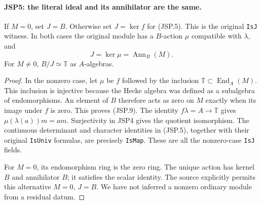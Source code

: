 \paragraph{JSP5: the literal ideal and its annihilator are the same.}
\label{claim:JSP5}
If $M=0$, set $J=B$. Otherwise set $J=\ker f$ for (JSP.5).
This is the original \texttt{IsJ} witness. In both cases the
original module has a $B$-action $\mu$ compatible with $\lambda$,
and
\[
               J=\ker\mu=\operatorname{Ann}_B(M).
 \tag{JSP.9}
\]
For $M\ne0$, $B/J\simeq\mathbb T$ as $A$-algebras.
\begin{proof}
In the nonzero case, let $\mu$ be $f$ followed by the inclusion
$\mathbb T\subset\operatorname{End}_A(M)$. This inclusion is
injective because the Hecke algebra was defined as a subalgebra
of endomorphisms. An element of $B$ therefore acts as zero on
$M$ exactly when its image under $f$ is zero. This proves
(JSP.9). The identity $f\lambda=A\to\mathbb T$ gives
$\mu(\lambda(a))m=am$. Surjectivity in JSP4 gives the
quotient isomorphism. The continuous determinant and character
identities in (JSP.5), together with their original
\texttt{IsUniv} formulas, are precisely \texttt{IsMap}.
These are all the nonzero-case \texttt{IsJ} fields.

For $M=0$, its endomorphism ring is the zero ring. The unique
action has kernel $B$ and annihilator $B$; it satisfies the
scalar identity. The source explicitly permits this alternative
$M=0$, $J=B$. We have not inferred a nonzero ordinary module
from a residual datum.
\end{proof}

